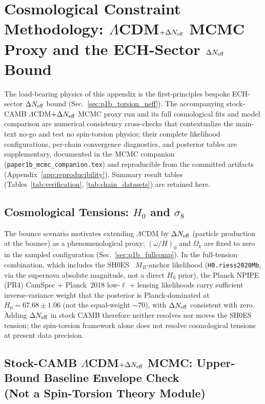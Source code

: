 \documentclass[aps,prd,twocolumn,superscriptaddress,showpacs,preprintnumbers,nofootinbib,longbibliography,floatfix]{revtex4-2}
\newcommand{\Neff}{N_{\rm eff}}
\begin{document}
\section{Cosmological Constraint Methodology: $\Lambda$CDM$+\Delta\Neff$ MCMC Proxy and the ECH-Sector $\Delta\Neff$ Bound}\label{app:cosmo_methodology}

The load-bearing physics of this appendix is the first-principles bespoke
ECH-sector $\Delta\Neff$ bound (Sec.~\ref{sec:p1b_torsion_neff}). The
accompanying stock-CAMB $\Lambda$CDM$+\Delta\Neff$ MCMC proxy run and its full
cosmological fits and model comparison are numerical consistency cross-checks
that contextualize the main-text no-go and test no spin-torsion physics; their
complete likelihood configurations, per-chain convergence diagnostics, and
posterior tables are supplementary, documented in the MCMC companion
(\texttt{paper1b\_mcmc\_companion.tex}) and reproducible from the committed
artifacts~\cite{BigBounceRepro} (Appendix~\ref{app:reproducibility}). Summary
result tables (Tables~\ref{tab:verification}, \ref{tab:chain_datasets}) are
retained here.

\subsection{Cosmological Tensions: $H_0$ and $\sigma_8$}\label{sec:p1b_tensions}

The bounce scenario motivates extending $\Lambda$CDM by $\Delta\Neff$ (particle
production at the bounce) as a phenomenological proxy; $(\omega/H)_0$ and
$\Omega_k$ are fixed to zero in the sampled configuration
(Sec.~\ref{sec:p1b_fullcomp}). In the full-tension combination, which includes
the SH0ES~\cite{Riess2022} $M_B$-anchor likelihood (\texttt{H0.riess2020Mb}, via
the supernova absolute magnitude, not a direct $H_0$ prior), the Planck NPIPE
(PR4) CamSpec + Planck~2018 low-$\ell$ + lensing likelihoods carry sufficient
inverse-variance weight that the posterior is Planck-dominated at
$H_0 = 67.68 \pm 1.06$ (not the equal-weight $\sim 70$), with $\Delta\Neff$
consistent with zero. Adding $\Delta\Neff$ in stock CAMB therefore neither
resolves nor moves the SH0ES tension; the spin-torsion framework alone does not
resolve cosmological tensions at present data precision.


\subsection{Stock-CAMB $\Lambda$CDM$+\Delta\Neff$ MCMC: Upper-Bound Baseline Envelope Check\\
(Not a Spin-Torsion Theory Module)}\label{sec:p1b_verification}
\end{document}
